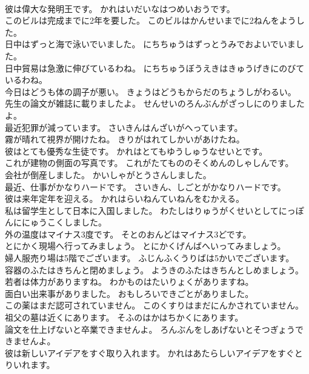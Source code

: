 \documentclass[8pt]{extreport}
\begin{document}
\begin{CJK}{UTF8}{min}
\\	彼は偉大な発明王です。	かれはいだいなはつめいおうです。 
\\	このビルは完成までに2年を要した。	このビルはかんせいまでに2ねんをようした。 
\\	日中はずっと海で泳いでいました。	にちちゅうはずっとうみでおよいでいました。 
\\	日中貿易は急激に伸びているわね。	にちちゅうぼうえきはきゅうげきにのびているわね。 
\\	今日はどうも体の調子が悪い。	きょうはどうもからだのちょうしがわるい。 
\\	先生の論文が雑誌に載りましたよ。	せんせいのろんぶんがざっしにのりましたよ。 
\\	最近犯罪が減っています。	さいきんはんざいがへっています。 
\\	霧が晴れて視界が開けたね。	きりがはれてしかいがあけたね。 
\\	彼はとても優秀な生徒です。	かれはとてもゆうしゅうなせいとです。 
\\	これが建物の側面の写真です。	これがたてもののそくめんのしゃしんです。 
\\	会社が倒産しました。	かいしゃがとうさんしました。 
\\	最近、仕事がかなりハードです。	さいきん、しごとがかなりハードです。 
\\	彼は来年定年を迎える。	かれはらいねんていねんをむかえる。 
\\	私は留学生として日本に入国しました。	わたしはりゅうがくせいとしてにっぽんににゅうこくしました。 
\\	外の温度はマイナス3度です。	そとのおんどはマイナス3どです。 
\\	とにかく現場へ行ってみましょう。	とにかくげんばへいってみましょう。 
\\	婦人服売り場は5階でございます。	ふじんふくうりばは5かいでございます。 
\\	容器のふたはきちんと閉めましょう。	ようきのふたはきちんとしめましょう。 
\\	若者は体力がありますね。	わかものはたいりょくがありますね。 
\\	面白い出来事がありました。	おもしろいできごとがありました。 
\\	この薬はまだ認可されていません。	このくすりはまだにんかされていません。 
\\	祖父の墓は近くにあります。	そふのはかはちかくにあります。 
\\	論文を仕上げないと卒業できませんよ。	ろんぶんをしあげないとそつぎょうできませんよ。 
\\	彼は新しいアイデアをすぐ取り入れます。	かれはあたらしいアイデアをすぐとりいれます。 

\end{CJK}
\end{document}
